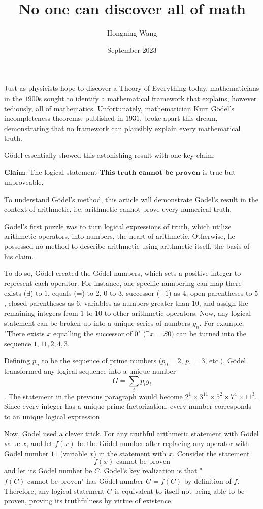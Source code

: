 \documentclass{article}
\title{No one can discover all of math}
\author{Hongning Wang}
\date{September 2023}
\begin{document}
\maketitle

Just as physicists hope to discover a Theory of Everything today, mathematicians in the $1900$s sought to identify a mathematical framework that explains, however tediously, all of mathematics. Unfortunately, mathematician Kurt Gödel's incompleteness theorems, published in $1931$, broke apart this dream, demonstrating that no framework can plausibly explain every mathematical truth. 

Gödel essentially showed this astonishing result with one key claim: 

$\textbf{Claim:}$ The logical statement $\textbf{This truth cannot be proven}$ is true but unproveable.

To understand Gödel's method, this article will demonstrate Gödel's result in the context of arithmetic, i.e. arithmetic cannot prove every numerical truth. 

Gödel's first puzzle was to turn logical expressions of truth, which utilize arithmetic operators, into numbers, the heart of arithmetic. Otherwise, he possessed no method to describe arithmetic using arithmetic itself, the basis of his claim. 

To do so, Gödel created the Gödel numbers, which sets a positive integer to represent each operator. For instance, one specific numbering can map there exists ($\exists$) to $1$, equals (=) to $2$, $0$ to $3$, successor ($+1$) as $4$, open parentheses to $5$, closed parentheses as $6$, variables as numbers greater than $10$, and assign the remaining integers from $1$ to $10$ to other arithmetic operators. Now, any logical statement can be broken up into a unique series of numbers $g_n$. For example, "There exists $x$ equalling the successor of $0$" ($\exists x = S0)$ can be turned into the sequence $1, 11, 2, 4, 3.$

Defining $p_n$ to be the sequence of prime numbers ($p_0 = 2$, $p_1 = 3$, etc.), Gödel transformed any logical sequence into a unique number \[G = \sum_{i} p_i g_i\]. The statement in the previous paragraph would become $2^1 \times 3^{11} \times 5^2 \times 7^4 \times 11^3$. Since every integer has a unique prime factorization, every number corresponds to an unique logical expression. 

Now, Gödel used a clever trick. For any truthful arithmetic statement with Gödel value $x$, and let $f(x)$ be the Gödel number after replacing any operator with Gödel number $11$ (variable $x$) in the statement with $x$. Consider the statement \[f(x) \text{ cannot be proven} \] and let its Gödel number be $C$. Gödel's key realization is that "$f(C) \text{ cannot be proven}$" has Gödel number $G=f(C)$ by definition of $f$. Therefore, any logical statement $G$ is equivalent to itself not being able to be proven, proving its truthfulness by virtue of existence. 
\end{document}
